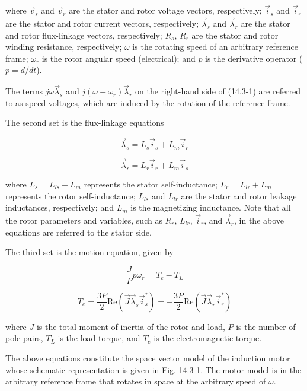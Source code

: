 \documentclass[letterpaper,12pt]{article}
\begin{document}
where $\vec{v}_s$ and $\vec{v}_r$ are the stator and rotor voltage vectors, respectively; $\vec{i}_s$ and $\vec{i}_r$ are the stator and rotor current vectors, respectively; $\vec{\lambda}_s$ and $\vec{\lambda}_r$ are the stator and rotor flux-linkage vectors, respectively; $R_s$, $R_r$ are the stator and rotor winding resistance, respectively; $\omega$ is the rotating speed of an arbitrary reference frame; $\omega_r$ is the rotor angular speed (electrical); and $p$ is the derivative operator ($p = d/dt$).

The terms $j\omega \vec{\lambda}_s$ and $j(\omega - \omega_r)\vec{\lambda}_r$ on the right-hand side of (14.3-1) are referred to as speed voltages, which are induced by the rotation of the reference frame.

The second set is the flux-linkage equations

\begin{equation}
\vec{\lambda}_s = L_s \vec{i}_s + L_m \vec{i}_r \tag{14.3-2}
\end{equation}

\begin{equation}
\vec{\lambda}_r = L_r \vec{i}_r + L_m \vec{i}_s \tag{14.3-2}
\end{equation}

where $L_s = L_{ls} + L_m$ represents the stator self-inductance; $L_r = L_{lr} + L_m$ represents the rotor self-inductance; $L_{ls}$ and $L_{lr}$ are the stator and rotor leakage inductances, respectively; and $L_m$ is the magnetizing inductance. Note that all the rotor parameters and variables, such as $R_r$, $L_{lr}$, $\vec{i}_r$, and $\vec{\lambda}_r$, in the above equations are referred to the stator side.

The third set is the motion equation, given by

\begin{equation}
\frac{J}{P} p\omega_r = T_e - T_L \tag{14.3-3}
\end{equation}

\begin{equation}
T_e = \frac{3P}{2} \text{Re}(\vec{J} \vec{\lambda}_s \vec{i}_s^*) = -\frac{3P}{2} \text{Re}(\vec{J} \vec{\lambda}_r \vec{i}_r^*) \tag{14.3-3}
\end{equation}

where $J$ is the total moment of inertia of the rotor and load, $P$ is the number of pole pairs, $T_L$ is the load torque, and $T_e$ is the electromagnetic torque.

The above equations constitute the space vector model of the induction motor whose schematic representation is given in Fig. 14.3-1. The motor model is in the arbitrary reference frame that rotates in space at the arbitrary speed of $\omega$.
\end{document}
